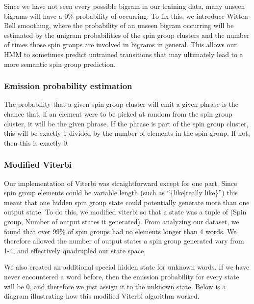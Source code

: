 \documentclass[11pt,letterpaper,oneside, titlepage]{scrartcl}
\begin{document}
Since we have not seen every possible bigram in our training data, many unseen bigrams will have a 0\% probability of occurring. To fix this, we introduce Witten-Bell smoothing, where the probability of an unseen bigram occurring will be estimated by the unigram probabilities of the spin group clusters and the number of times those spin groups are involved in bigrams in general. This allows our HMM to sometimes predict untrained transitions that may ultimately lead to a more semantic spin group prediction.

\subsubsection{Emission probability estimation}

The probability that a given spin group cluster will emit a given phrase is the chance that, if an element were to be picked at random from the spin group cluster, it will be the given phrase. If the phrase is part of the spin group cluster, this will be exactly 1 divided by the number of elements in the spin group. If not, then this is exactly 0.

\subsubsection{Modified Viterbi}

Our implementation of Viterbi was straightforward except for one part. Since spin group elements could be variable length (such as ``\{like|really like\}”) this meant that one hidden spin group state could potentially generate more than one output state. To do this, we modified viterbi so that a state was a tuple of (Spin group, Number of output states it generated). From analyzing our dataset, we found that over 99\% of spin groups had no elements longer than 4 words. We therefore allowed the number of output states a spin group generated vary from 1-4, and effectively quadrupled our state space. 

We also created an additional special hidden state for unknown words. If we have never encountered a word before, then the emission probability for every state will be 0, and therefore we just assign it to the unknown state. Below is a diagram illustrating how this modified Viterbi algorithm worked.
\end{document}
